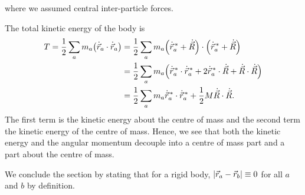\documentclass{article}
\begin{document}
where we assumed central inter-particle forces.
\par
The total kinetic energy of the body is
\begin{align}
    \begin{split}
        T = \frac{1}{2} \sum_a m_a \qty(\dot{\vec{r}}_a \cdot \dot{\vec{r}}_a) &= \frac{1}{2} \sum_a m_a \qty(\dot{\vec{r}}^{\,*}_a + \dot{\vec{R}}) \cdot \qty(\dot{\vec{r}}^{\,*}_a + \dot{\vec{R}}) \\
        &= \frac{1}{2} \sum_a m_a \qty(\dot{\vec{r}}^{\,*}_a \cdot \dot{\vec{r}}^{\,*}_a + 2 \dot{\vec{r}}^{\,*}_a \cdot \dot{\vec{R}} + \dot{\vec{R}}\cdot\dot{\vec{R}}) \\
        &= \frac{1}{2} \sum_a m_a \dot{\vec{r}}^{\,*}_a \cdot \dot{\vec{r}}^{\,*}_a + \frac{1}{2} M \dot{\vec{R}}\cdot\dot{\vec{R}}.
    \end{split}
\end{align}
The first term is the kinetic energy about the centre of mass and the second term the kinetic energy of the centre of mass. Hence, we see that both the kinetic energy and the angular momentum decouple into a centre of mass part and a part about the centre of mass.
\par
We conclude the section by stating that for a rigid body, $\abs{\vec{r}_a - \vec{r}_b} \equiv 0$ for all $a$ and $b$ by definition.
\end{document}

